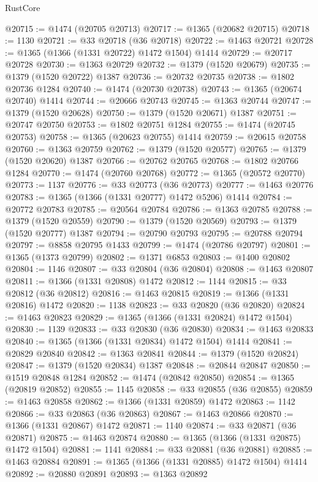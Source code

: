 \begin{lexlean}{RustCore}
\begin{coremodule}
@20715 := @1474 (@20705 @20713)
@20717 := @1365 (@20682 @20715)
@20718 := 1130
@20721 := @33 @20718 (@36 @20718)
@20722 := @1463 @20721
@20728 := @1365 (@1366 (@1331 @20722) @1472 @1504) @1414
@20729 := @20717 @20728
@20730 := @1363 @20729
@20732 := @1379 (@1520 @20679)
@20735 := @1379 (@1520 @20722) @1387
@20736 := @20732 @20735
@20738 := @1802 @20736 @1284
@20740 := @1474 (@20730 @20738)
@20743 := @1365 (@20674 @20740) @1414
@20744 := @20666 @20743
@20745 := @1363 @20744
@20747 := @1379 (@1520 @20628)
@20750 := @1379 (@1520 @20671) @1387
@20751 := @20747 @20750
@20753 := @1802 @20751 @1284
@20755 := @1474 (@20745 @20753)
@20758 := @1365 (@20623 @20755) @1414
@20759 := @20615 @20758
@20760 := @1363 @20759
@20762 := @1379 (@1520 @20577)
@20765 := @1379 (@1520 @20620) @1387
@20766 := @20762 @20765
@20768 := @1802 @20766 @1284
@20770 := @1474 (@20760 @20768)
@20772 := @1365 (@20572 @20770)
@20773 := 1137
@20776 := @33 @20773 (@36 @20773)
@20777 := @1463 @20776
@20783 := @1365 (@1366 (@1331 @20777) @1472 @5206) @1414
@20784 := @20772 @20783
@20785 := @20564 @20784
@20786 := @1363 @20785
@20788 := @1379 (@1520 @20559)
@20790 := @1379 (@1520 @20569)
@20793 := @1379 (@1520 @20777) @1387
@20794 := @20790 @20793
@20795 := @20788 @20794
@20797 := @8858 @20795 @1433
@20799 := @1474 (@20786 @20797)
@20801 := @1365 (@1373 @20799)
@20802 := @1371 @6853
@20803 := @1400 @20802
@20804 := 1146
@20807 := @33 @20804 (@36 @20804)
@20808 := @1463 @20807
@20811 := @1366 (@1331 @20808) @1472
@20812 := 1144
@20815 := @33 @20812 (@36 @20812)
@20816 := @1463 @20815
@20819 := @1366 (@1331 @20816) @1472
@20820 := 1138
@20823 := @33 @20820 (@36 @20820)
@20824 := @1463 @20823
@20829 := @1365 (@1366 (@1331 @20824) @1472 @1504)
@20830 := 1139
@20833 := @33 @20830 (@36 @20830)
@20834 := @1463 @20833
@20840 := @1365 (@1366 (@1331 @20834) @1472 @1504) @1414
@20841 := @20829 @20840
@20842 := @1363 @20841
@20844 := @1379 (@1520 @20824)
@20847 := @1379 (@1520 @20834) @1387
@20848 := @20844 @20847
@20850 := @1519 @20848 @1284
@20852 := @1474 (@20842 @20850)
@20854 := @1365 (@20819 @20852)
@20855 := 1145
@20858 := @33 @20855 (@36 @20855)
@20859 := @1463 @20858
@20862 := @1366 (@1331 @20859) @1472
@20863 := 1142
@20866 := @33 @20863 (@36 @20863)
@20867 := @1463 @20866
@20870 := @1366 (@1331 @20867) @1472
@20871 := 1140
@20874 := @33 @20871 (@36 @20871)
@20875 := @1463 @20874
@20880 := @1365 (@1366 (@1331 @20875) @1472 @1504)
@20881 := 1141
@20884 := @33 @20881 (@36 @20881)
@20885 := @1463 @20884
@20891 := @1365 (@1366 (@1331 @20885) @1472 @1504) @1414
@20892 := @20880 @20891
@20893 := @1363 @20892

\end{coremodule}
\end{lexlean}
